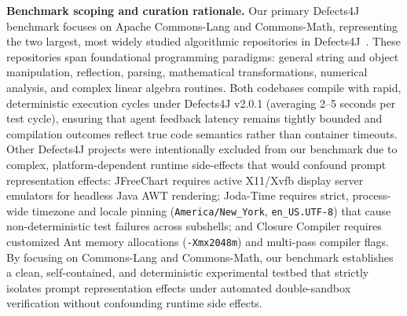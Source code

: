 \documentclass[12pt, a4paper]{article}
\begin{document}
\textbf{Benchmark scoping and curation rationale.}
Our primary Defects4J benchmark focuses on Apache Commons-Lang and Commons-Math, representing the two largest, most widely studied algorithmic repositories in Defects4J~\citep{just2014defects4j,an2022fdg}.
These repositories span foundational programming paradigms: general string and object manipulation, reflection, parsing, mathematical transformations, numerical analysis, and complex linear algebra routines.
Both codebases compile with rapid, deterministic execution cycles under Defects4J v2.0.1 (averaging 2--5 seconds per test cycle), ensuring that agent feedback latency remains tightly bounded and compilation outcomes reflect true code semantics rather than container timeouts.
Other Defects4J projects were intentionally excluded from our benchmark due to complex, platform-dependent runtime side-effects that would confound prompt representation effects: JFreeChart requires active X11/Xvfb display server emulators for headless Java AWT rendering; Joda-Time requires strict, process-wide timezone and locale pinning (\texttt{America/New\_York}, \texttt{en\_US.UTF-8}) that cause non-deterministic test failures across subshells; and Closure Compiler requires customized Ant memory allocations (\texttt{-Xmx2048m}) and multi-pass compiler flags.
By focusing on Commons-Lang and Commons-Math, our benchmark establishes a clean, self-contained, and deterministic experimental testbed that strictly isolates prompt representation effects under automated double-sandbox verification without confounding runtime side effects.
\end{document}
